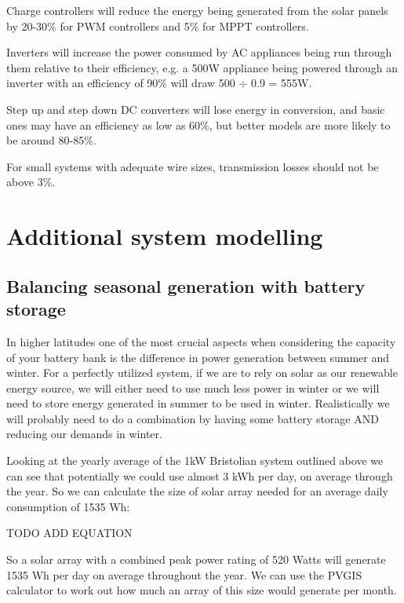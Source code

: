 \documentclass{article}
\theoremstyle{definition}
\theoremstyle{definition}
\theoremstyle{remark}
\begin{document}
    Charge controllers will reduce the energy being generated from the solar panels by 20-30\% for PWM controllers and 5\% for MPPT controllers. 

    Inverters will increase the power consumed by AC appliances being run through them relative to their efficiency, e.g. a 500W appliance being powered through an inverter with an efficiency of 90\% will draw 500 \(\div\) 0.9 = 555W.

    Step up and step down DC converters will lose energy in conversion, and basic ones may have an efficiency as low as 60\%, but better models are more likely to be around 80-85\%. 

    For small systems with adequate wire sizes, transmission losses should not be above 3\%.  
  


{\color{blue}\section{Additional system modelling}} %
\label{sec:additional_system_modelling}

  {\color{blue}\subsection{Balancing seasonal generation with battery storage}} %
  \label{sub:balancing_seasonal_generation_with_battery_storage}

    In higher latitudes one of the most crucial aspects when considering the capacity of your battery bank is the difference in power generation between summer and winter. For a perfectly utilized system, if we are to rely on solar as our renewable energy source, we will either need to use much less power in winter or we will need to store energy generated in summer to be used in winter. Realistically we will probably need to do a combination by having some battery storage AND reducing our demands in winter.

    Looking at the yearly average of the 1kW Bristolian system outlined above we can see that potentially we could use almost 3 kWh per day, on average through the year. So we can calculate the size of solar array needed for an average daily consumption of 1535 Wh:

    TODO ADD EQUATION

    So a solar array with a combined peak power rating of 520 Watts will generate 1535 Wh per day on average throughout the year. We can use the PVGIS calculator to work out how much an array of this size would generate per month.
\end{document}
